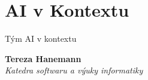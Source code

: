 \documentclass[aspectratio=169,dvipsnames]{beamer}
\begin{document}
\maketitle

\section{AI v Kontextu}

\begin{frame}{Tým AI v kontextu}

    \begin{minipage}{70pt}
    \end{minipage}\begin{minipage}{200pt}
        \textbf{Tereza Hanemann} \\
        \textit{Katedra softwaru a výuky informatiky}
    \end{minipage}

    \vspace{10pt}


\end{frame}
\end{document}
